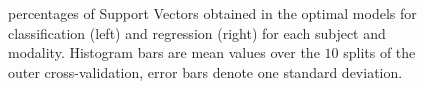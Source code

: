 \documentclass[review,authoryear]{elsarticle}
\begin{document}
\begin{figure}
  \caption{percentages of Support Vectors obtained in the optimal models
  	for classification (left) and regression (right) for each subject and modality.
    Histogram bars are mean values over the $10$ splits of
    the outer cross-validation, error bars denote one standard deviation.}
  \label{fig:SVs}
\end{figure}

%
%
%
%
%
%
%
%
%
%
%
%
%
%
%
%
%
\end{document}
